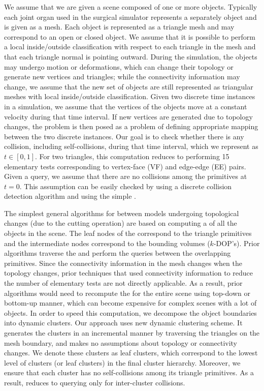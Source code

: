 We assume that we are given a scene composed of one or more objects. Typically each joint organ used in the surgical simulator represents a separately object and is given as a mesh. Each object is represented as a triangle mesh and may correspond to an open or closed object. We assume that it is possible to perform a local inside/outside classification with respect to each triangle in the mesh and that each triangle normal is pointing outward. During the  simulation, the objects may undergo motion or deformations, which can change their topology or generate new vertices and triangles; while the connectivity information may change, we assume that the new set of objects are still represented as triangular meshes with local inside/outside classification. Given two discrete time instances in a simulation, we assume that the vertices of the objects move at a constant velocity during that time interval. If new vertices are generated due to topology changes, the  problem is then posed as a problem of defining appropriate mapping between the two discrete instances. Our goal is to check whether there is any collision, including self-collisions, during that time interval, which we represent as $t \in [0, 1]$. For two triangles, this computation reduces to performing 15 elementary tests corresponding to vertex-face (VF) and edge-edge (EE) pairs. Given a  query, we assume that there are no collisions among the primitives at $t = 0$. This assumption can be easily checked by using a discrete collision detection algorithm and using the simple .

The simplest general algorithms for  between models undergoing topological changes (due to the cutting operation) are based on computing a  of all the objects in the scene. The leaf nodes of the  correspond to the triangle primitives and the intermediate nodes correspond to the bounding volumes (\eg $k$-DOP's). Prior  algorithms traverse the  and perform the  queries between the overlapping primitives. Since the connectivity information in the mesh changes when the topology changes, prior techniques that used connectivity information to reduce the number of elementary tests are not directly applicable. As a result, prior algorithms would need to recompute the  for the entire scene using top-down or bottom-up manner, which can become expensive for complex scenes with a lot of objects. In order to speed this  computation, we decompose the object boundaries into dynamic clusters. Our approach uses new dynamic clustering scheme. It generates the clusters in an incremental manner by traversing the triangles on the mesh boundary, and makes no assumptions about topology or connectivity changes. We denote these clusters as leaf clusters, which correspond to the lowest level of clusters (or leaf clusters) in the final cluster hierarchy. Moreover, we ensure that each cluster has no self-collisions among its triangle primitives. As a result,  reduces to querying only for inter-cluster collisions.

